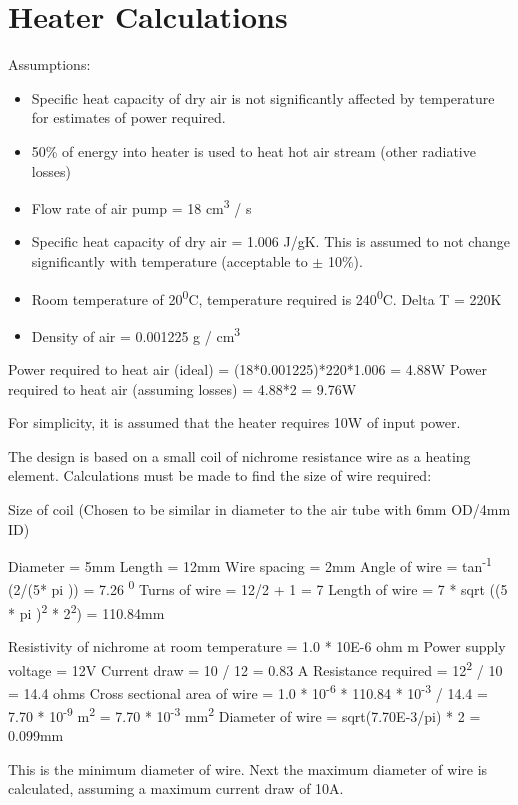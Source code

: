\section{Heater Calculations}
\label{heatcalc}
Assumptions:
\begin{itemize} \itemsep0em
	\item Specific heat capacity of dry air is not significantly affected by temperature for estimates of power required.
	\item 50\% of energy into heater is used to heat hot air stream (other radiative losses)
	\item Flow rate of air pump = 18 cm\textsuperscript{3} / s
	\item Specific heat capacity of dry air = 1.006 J/gK. This is assumed to not change significantly with temperature (acceptable to $\pm$ 10\%).
	\item Room temperature of 20\textsuperscript{0}C, temperature required is 240\textsuperscript{0}C. Delta T = 220K
	\item Density of air = 0.001225 g / cm\textsuperscript{3}
\end{itemize}

Power required to heat air (ideal) = (18*0.001225)*220*1.006 = 4.88W
Power required to heat air (assuming losses) = 4.88*2 = 9.76W

For simplicity, it is assumed that the heater requires 10W of input power.

The design is based on a small coil of nichrome resistance wire as a heating element. Calculations must be made to find
the size of wire required:

Size of coil (Chosen to be similar in diameter to the air tube with 6mm OD/4mm ID)

Diameter = 5mm
Length = 12mm
Wire spacing = 2mm
Angle of wire = tan\textsuperscript{-1} (2/(5* pi )) = 7.26 \textsuperscript{0}
Turns of wire = 12/2 + 1 = 7
Length of wire = 7 * sqrt ((5 * pi )\textsuperscript{2}  * 2\textsuperscript{2}) =  110.84mm

Resistivity of nichrome at room temperature = 1.0 * 10E-6 ohm m 
Power supply voltage = 12V
Current draw = 10 / 12 = 0.83 A 
Resistance required = 12\textsuperscript{2} / 10 = 14.4 ohms
Cross sectional area of wire = 1.0 * 10\textsuperscript{-6} * 110.84 * 10\textsuperscript{-3} / 14.4 = 7.70 * 10\textsuperscript{-9} m\textsuperscript{2} = 7.70 * 10\textsuperscript{-3} mm\textsuperscript{2}
Diameter of wire = sqrt(7.70E-3/pi) * 2 = 0.099mm

This is the minimum diameter of wire. Next the maximum diameter of wire is calculated, assuming a maximum current draw of 10A.

